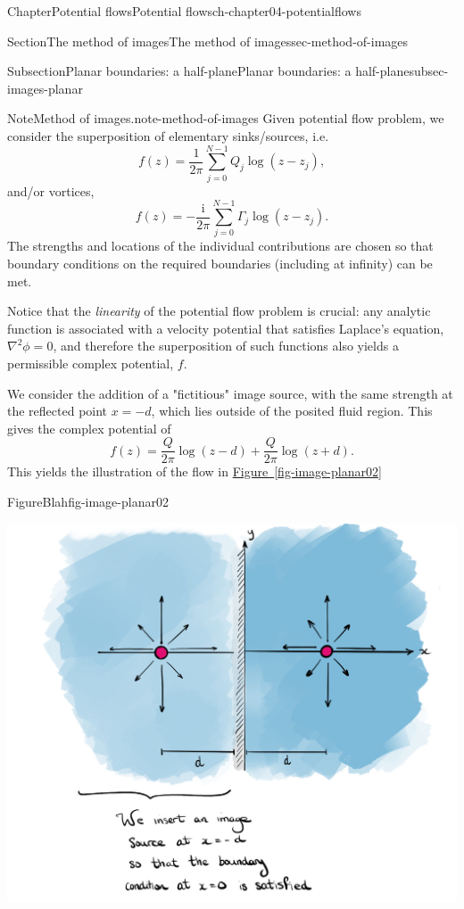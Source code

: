 \documentclass[oneside,10pt,]{book}
\newcommand{\xreffont}{\relax}
\numberwithin{equation}{section}
\newcommand{\im}{\mathrm{i}}
\begin{document}
\begin{chapterptx}{Chapter}{Potential flows}{}{Potential flows}{}{}{ch-chapter04-potentialflows}
\begin{sectionptx}{Section}{The method of images}{}{The method of images}{}{}{sec-method-of-images}
\begin{subsectionptx}{Subsection}{Planar boundaries: a half-plane}{}{Planar boundaries: a half-plane}{}{}{subsec-images-planar}
\begin{note}{Note}{Method of images.}{note-method-of-images}%
Given potential flow problem, we consider the superposition of elementary sinks\slash{}sources, i.e.%
\begin{equation*}
f(z) = \frac{1}{2\pi} \sum_{j=0}^{N-1} Q_j \log(z - z_j), 
\end{equation*}
and\slash{}or vortices,%
\begin{equation*}
f(z) = -\frac{\im}{2\pi} \sum_{j=0}^{N-1} \Gamma_j \log(z - z_j).
\end{equation*}
The strengths and locations of the individual contributions are chosen so that boundary conditions on the required boundaries (including at infinity) can be met.%
\end{note}
Notice that the \emph{linearity} of the potential flow problem is crucial: any analytic function is associated with a velocity potential that satisfies Laplace's equation, \(\nabla^2 \phi = 0\), and therefore the superposition of such functions also yields a permissible complex potential, \(f\).%
\par
We consider the addition of a "fictitious" image source, with the same strength at the reflected point \(x = -d\), which lies outside of the posited fluid region. This gives the complex potential of%
\begin{equation*}
f(z) = \frac{Q}{2\pi} \log(z - d) + \frac{Q}{2\pi} \log(z + d). 
\end{equation*}
This yields the illustration of the flow in \hyperref[fig-image-planar02]{Figure~{\xreffont\ref{fig-image-planar02}}}%
\begin{figureptx}{Figure}{Blah}{fig-image-planar02}{}%
\begin{image}{0.1}{0.8}{0.1}{}%
\includegraphics[width=\linewidth]{external/image-planar02.jpg}

\end{image}
\end{figureptx}
\end{subsectionptx}
\end{sectionptx}
\end{chapterptx}
\end{document}
